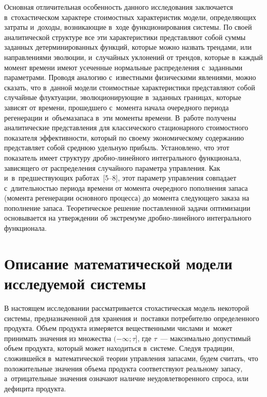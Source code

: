 \begin{multicols}{2}
Основная отличительная особенность данного исследования заключается 
в~стохастическом характере стоимостных характеристик модели, определяющих затраты и~доходы, возникающие в~ходе функционирования системы. По своей аналитической 
структуре все эти характеристики пред\-став\-ля\-ют собой суммы заданных 
детерминированных функций, которые можно назвать трендами, или направлениями 
эволюции, и~случайных уклонений от трендов, которые в~каждый момент времени 
имеют усеченные нормальные распределения с~заданными па\-ра\-мет\-ра\-ми. Проводя 
аналогию с~известными физическими явлениями, можно сказать, что в~данной модели 
стоимостные характеристики представляют собой случайные флуктуации, 
эволюционирующие в~заданных границах, которые зависят от времени, прошедшего 
с~момента начала очередного периода регенерации и~объема\linebreak запаса в~эти моменты 
времени. В~работе получены аналитические пред\-став\-ле\-ния для классического 
стационарного стоимостного показателя эф\-фек\-тив\-ности, который по своему 
экономическому \mbox{содержанию} пред\-став\-ля\-ет собой сред\-нюю удель\-ную прибыль. 
Установлено, что этот показатель имеет структуру дроб\-но-ли\-ней\-но\-го интегрального 
функционала, зависящего от распределения случайного па\-ра\-мет\-ра управ\-ле\-ния. Как 
и~в~пред\-шест\-ву\-ющих работах~[5--8], этот параметр управления совпадает 
с~дли\-тель\-ностью периода времени от момента очередного пополнения запаса (момента 
регенерации основного процесса) до момента сле\-ду\-юще\-го заказа на пополнение 
запаса. Тео\-ре\-ти\-че\-ское решение по\-став\-лен\-ной задачи оптимизации основывается на 
утверждении об экстремуме дроб\-но-ли\-ней\-но\-го интегрального функционала.

\vspace*{-6pt}

\section{Описание математической модели исследуемой системы}

\vspace*{-3pt}

В настоящем исследовании рассматривается стохастическая модель некоторой 
системы, предназначенной для хранения и~поставки потребителю определенного 
продукта. Объем продукта измеряется вещественными числами и~может принимать 
значения из множества $(-\infty;\tau]$, где $\tau$~--- максимально допустимый 
объем продукта, который может находиться в~сис\-те\-ме. Следуя традиции, сложившейся в~математической теории управления запасами, будем считать, что положительные 
значения объема продукта соответствуют реальному запасу, а~отрицательные 
значения означают наличие неудовлетворенного спроса, или дефицита продукта.


\end{multicols}
